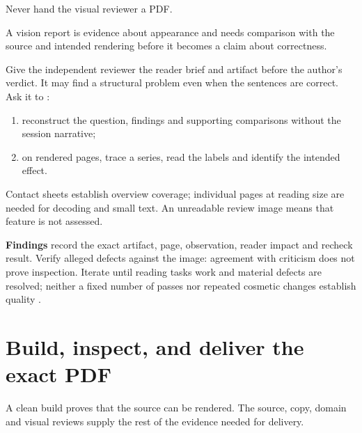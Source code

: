\begin{rulebox}
  Never hand the visual reviewer a PDF.
\end{rulebox}

A vision report is evidence about appearance and needs comparison with the source and
intended rendering before it becomes a claim about correctness.

Give the independent reviewer the reader brief and artifact before the author's verdict.
It may find a structural problem even when the sentences are correct. Ask it to
\cite[Review packet; Figure and page tasks; Companion comprehension
  tasks]{skill:visual-review}:
\begin{enumerate}
  \item reconstruct the question, findings and supporting comparisons without the session
        narrative;
  \item on rendered pages, trace a series, read the labels and identify the intended effect.
\end{enumerate}
Contact sheets establish overview coverage; individual pages at reading size are needed for
decoding and small text. An unreadable review image means that feature is not assessed.

\textbf{Findings} record the exact artifact, page, observation, reader impact and
recheck result. Verify alleged defects against the image: agreement with criticism does
not prove inspection. Iterate until reading tasks work and material defects are resolved;
neither a fixed number of passes nor repeated cosmetic changes establish quality
\cite[Findings and revision]{skill:visual-review}.

\section{Build, inspect, and deliver the exact PDF}

\begin{headline}
  A clean build proves that the source can be rendered. The source, copy, domain and visual
  reviews supply the rest of the evidence needed for delivery.
\end{headline}

